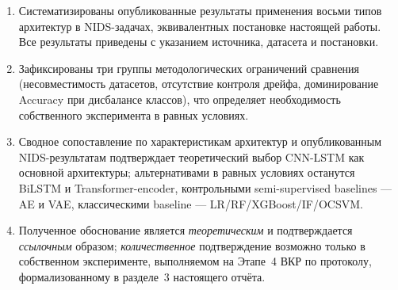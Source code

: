 \begin{enumerate}
    \item Систематизированы опубликованные результаты применения восьми
    типов архитектур в NIDS-задачах, эквивалентных постановке настоящей
    работы. Все результаты приведены с указанием источника, датасета и
    постановки.
    \item Зафиксированы три группы методологических ограничений сравнения
    (несовместимость датасетов, отсутствие контроля дрейфа, доминирование
    Accuracy при дисбалансе классов), что определяет необходимость
    собственного эксперимента в равных условиях.
    \item Сводное сопоставление по характеристикам архитектур и опубликованным
    NIDS-результатам подтверждает теоретический выбор CNN-LSTM как основной
    архитектуры; альтернативами в равных условиях останутся BiLSTM и
    Transformer-encoder, контрольными semi-supervised baselines --- AE и VAE,
    классическими baseline --- LR/RF/XGBoost/IF/OCSVM.
    \item Полученное обоснование является \emph{теоретическим} и подтверждается
    \emph{ссылочным} образом; \emph{количественное} подтверждение возможно
    только в собственном эксперименте, выполняемом на Этапе~4 ВКР по
    протоколу, формализованному в разделе~3 настоящего отчёта.
\end{enumerate}
